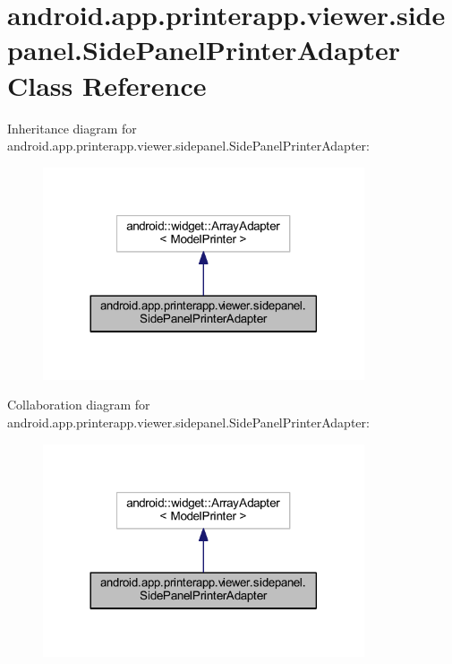 \hypertarget{classandroid_1_1app_1_1printerapp_1_1viewer_1_1sidepanel_1_1_side_panel_printer_adapter}{}\section{android.\+app.\+printerapp.\+viewer.\+sidepanel.\+Side\+Panel\+Printer\+Adapter Class Reference}
\label{classandroid_1_1app_1_1printerapp_1_1viewer_1_1sidepanel_1_1_side_panel_printer_adapter}


Inheritance diagram for android.\+app.\+printerapp.\+viewer.\+sidepanel.\+Side\+Panel\+Printer\+Adapter\+:
\nopagebreak
\begin{figure}[H]
\begin{center}
\leavevmode
\includegraphics[width=269pt]{classandroid_1_1app_1_1printerapp_1_1viewer_1_1sidepanel_1_1_side_panel_printer_adapter__inherit__graph}
\end{center}
\end{figure}


Collaboration diagram for android.\+app.\+printerapp.\+viewer.\+sidepanel.\+Side\+Panel\+Printer\+Adapter\+:
\nopagebreak
\begin{figure}[H]
\begin{center}
\leavevmode
\includegraphics[width=269pt]{classandroid_1_1app_1_1printerapp_1_1viewer_1_1sidepanel_1_1_side_panel_printer_adapter__coll__graph}
\end{center}
\end{figure}
